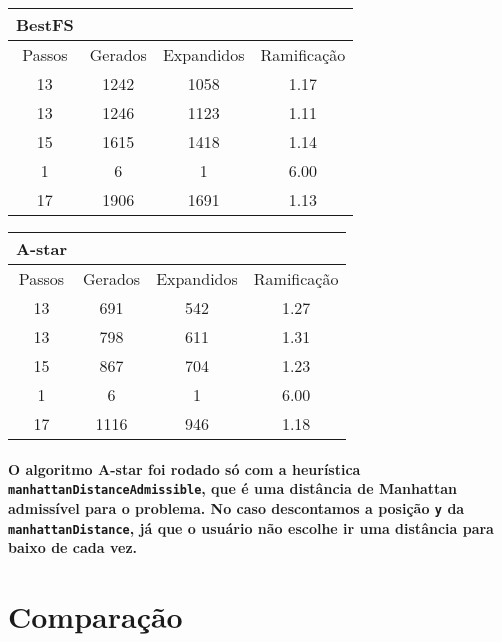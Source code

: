 \documentclass[a4paper,10pt]{article}
\theoremstyle{plain}
\begin{document}
\begin{table}[h]
\begin{center}
\begin{tabular}{*{3}{c|}c}
BestFS \\
\hline
Passos & Gerados & Expandidos & Ramificação \\
\hline
13 &  1242 & 1058 & 1.17 \\
13 &  1246 & 1123 & 1.11 \\ 
15 &  1615 & 1418 & 1.14 \\ 
1  &  6    & 1    & 6.00 \\
17 &  1906 & 1691 & 1.13 \\
\end{tabular}
\end{center}
\end{table}

\begin{table}[h]
\begin{center}
\begin{tabular}{*{3}{c|}c}
A-star \\
\hline
Passos & Gerados & Expandidos & Ramificação \\
\hline
13 &  691  &  542  &  1.27 \\ 
13 &  798  &  611  &  1.31 \\
15 &  867  &  704  &  1.23 \\
1  &  6    &  1    &  6.00 \\
17 &  1116 &  946  &  1.18 \\
\end{tabular}
\end{center}
\end{table}

\paragraph{
  O algoritmo A-star foi rodado só com a heurística \texttt{manhattanDistanceAdmissible}, que
é uma distância de Manhattan admissível para o problema. No caso descontamos a posição \texttt{y}
da \texttt{manhattanDistance}, já que o usuário não escolhe ir uma distância para baixo de cada
vez.
}

\section{Comparação}
\end{document}
